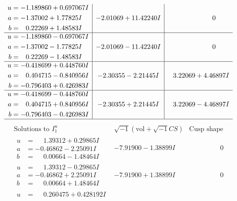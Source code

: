 \documentclass[1p]{elsarticle_modified}
\theoremstyle{definition}
\newcommand{\I}{\sqrt{-1}}
\begin{document}
$$\begin{array}{c|c|c}
\begin{aligned}
u &= -1.189860 + 0.697067 I \\
a &= -1.37002 + 1.77825 I \\
b &= \phantom{-}0.22269 + 1.48583 I\end{aligned}
 & -2.01069 + 11.42240 I & \phantom{-0.000000 } 0 \\ \hline\begin{aligned}
u &= -1.189860 - 0.697067 I \\
a &= -1.37002 - 1.77825 I \\
b &= \phantom{-}0.22269 - 1.48583 I\end{aligned}
 & -2.01069 - 11.42240 I & \phantom{-0.000000 } 0 \\ \hline\begin{aligned}
u &= -0.418699 + 0.448760 I \\
a &= \phantom{-}0.404715 - 0.840956 I \\
b &= -0.796403 + 0.426983 I\end{aligned}
 & -2.30355 - 2.21445 I & \phantom{-}3.22069 + 4.46897 I \\ \hline\begin{aligned}
u &= -0.418699 - 0.448760 I \\
a &= \phantom{-}0.404715 + 0.840956 I \\
b &= -0.796403 - 0.426983 I\end{aligned}
 & -2.30355 + 2.21445 I & \phantom{-}3.22069 - 4.46897 I\\
 \hline 
 \end{array}$$\newpage$$\begin{array}{c|c|c}  
\text{Solutions to }I^u_{1}& \I (\text{vol} + \sqrt{-1}CS) & \text{Cusp shape}\\
 \hline 
\begin{aligned}
u &= \phantom{-}1.39312 + 0.29865 I \\
a &= -0.46862 - 2.25091 I \\
b &= \phantom{-}0.00664 - 1.48464 I\end{aligned}
 & -7.91900 - 1.38899 I & \phantom{-0.000000 } 0 \\ \hline\begin{aligned}
u &= \phantom{-}1.39312 - 0.29865 I \\
a &= -0.46862 + 2.25091 I \\
b &= \phantom{-}0.00664 + 1.48464 I\end{aligned}
 & -7.91900 + 1.38899 I & \phantom{-0.000000 } 0 \\ \hline\begin{aligned}
u &= \phantom{-}0.260475 + 0.428192 I \\

\end{aligned}
\end{array}$$
\end{document}

